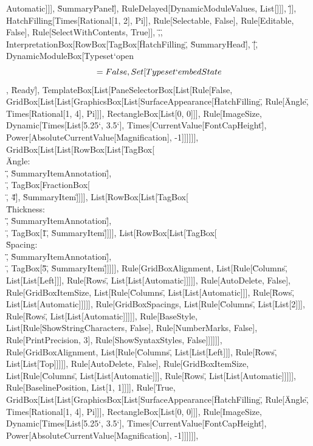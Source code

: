 \documentclass{article}
\begin{document}
{{{{$$Automatic]]], \"SummaryPanel\"], RuleDelayed[DynamicModuleValues, List[]]], \"]\"}], HatchFilling[Times[Rational[1, 2], Pi]], Rule[Selectable, False],
Rule[Editable, False], Rule[SelectWithContents, True]], \",\", InterpretationBox[RowBox[{TagBox[\"HatchFilling\", \"SummaryHead\"], \"[\", DynamicModuleBox[{Typeset`open$$
= False, Set[Typeset`embedState$$, \"Ready\"]}, TemplateBox[List[PaneSelectorBox[List[Rule[False, GridBox[List[List[GraphicsBox[List[SurfaceAppearance[\"HatchFilling\",
Rule[\"Angle\", Times[Rational[1, 4], Pi]]], RectangleBox[List[0, 0]]], Rule[ImageSize, Dynamic[Times[List[5.25`, 3.5`], Times[CurrentValue[\"FontCapHeight\"],
Power[AbsoluteCurrentValue[Magnification], -1]]]]]], GridBox[List[List[RowBox[List[TagBox[\"\\\"Angle: \\\"\", \"SummaryItemAnnotation\"], \"\\[InvisibleSpace]\",
TagBox[FractionBox[\"\\[Pi]\", \"4\"], \"SummaryItem\"]]]], List[RowBox[List[TagBox[\"\\\"Thickness: \\\"\", \"SummaryItemAnnotation\"], \"\\[InvisibleSpace]\",
TagBox[\"1\", \"SummaryItem\"]]]], List[RowBox[List[TagBox[\"\\\"Spacing: \\\"\", \"SummaryItemAnnotation\"], \"\\[InvisibleSpace]\", TagBox[\"5\",
\"SummaryItem\"]]]]], Rule[GridBoxAlignment, List[Rule[\"Columns\", List[List[Left]]], Rule[\"Rows\", List[List[Automatic]]]]], Rule[AutoDelete,
False], Rule[GridBoxItemSize, List[Rule[\"Columns\", List[List[Automatic]]], Rule[\"Rows\", List[List[Automatic]]]]], Rule[GridBoxSpacings, List[Rule[\"Columns\",
List[List[2]]], Rule[\"Rows\", List[List[Automatic]]]]], Rule[BaseStyle, List[Rule[ShowStringCharacters, False], Rule[NumberMarks, False], Rule[PrintPrecision,
3], Rule[ShowSyntaxStyles, False]]]]]], Rule[GridBoxAlignment, List[Rule[\"Columns\", List[List[Left]]], Rule[\"Rows\", List[List[Top]]]]], Rule[AutoDelete,
False], Rule[GridBoxItemSize, List[Rule[\"Columns\", List[List[Automatic]]], Rule[\"Rows\", List[List[Automatic]]]]], Rule[BaselinePosition, List[1,
1]]]], Rule[True, GridBox[List[List[GraphicsBox[List[SurfaceAppearance[\"HatchFilling\", Rule[\"Angle\", Times[Rational[1, 4], Pi]]], RectangleBox[List[0,
0]]], Rule[ImageSize, Dynamic[Times[List[5.25`, 3.5`], Times[CurrentValue[\"FontCapHeight\"], Power[AbsoluteCurrentValue[Magnification], -1]]]]]],
}}}}
\end{document}
